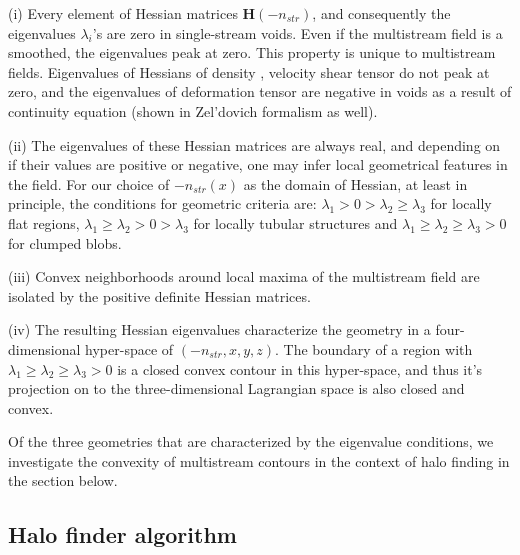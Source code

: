 (i) Every element of Hessian matrices $\mathbf{H}(-n_{str})$, and consequently the eigenvalues $\lambda_i$'s are zero in single-stream voids. Even if the multistream field is a smoothed, the eigenvalues peak at zero. This property is unique to multistream fields. Eigenvalues of Hessians of density \cite{Aragon-Calvo2007}, velocity shear tensor \cite{Libeskind2013} do not peak at zero, and the eigenvalues of deformation tensor are negative in voids as a result of continuity equation (shown in Zel'dovich formalism as well).

(ii) The eigenvalues of these Hessian matrices are always real, and depending on if their values are positive or negative, one may infer local geometrical features in the field. For our choice of $-n_{str}(x)$ as the domain of Hessian, at least in principle, the conditions for geometric criteria are: $\lambda_1 > 0 > \lambda_2 \geq \lambda_3$ for locally flat regions, $\lambda_1 \geq \lambda_2 > 0 > \lambda_3$ for locally tubular structures and $\lambda_1 \geq \lambda_2 \geq \lambda_3 > 0$ for clumped blobs. 

(iii) Convex neighborhoods around local maxima of the multistream field are isolated by the positive definite Hessian matrices. 

(iv) The resulting Hessian eigenvalues characterize the geometry in a four-dimensional
hyper-space of $(-n_{str}, x, y, z)$. The boundary of a region with $\lambda_1 \geq \lambda_2 \geq \lambda_3 > 0$ is a closed convex contour in this hyper-space, and thus it's projection on to the three-dimensional Lagrangian space is also closed and convex.

Of the three geometries that are characterized by the eigenvalue conditions, we investigate the convexity of multistream contours in the context of halo finding in the section below.


\subsection{Halo finder algorithm}
\label{subsec:5technique}




